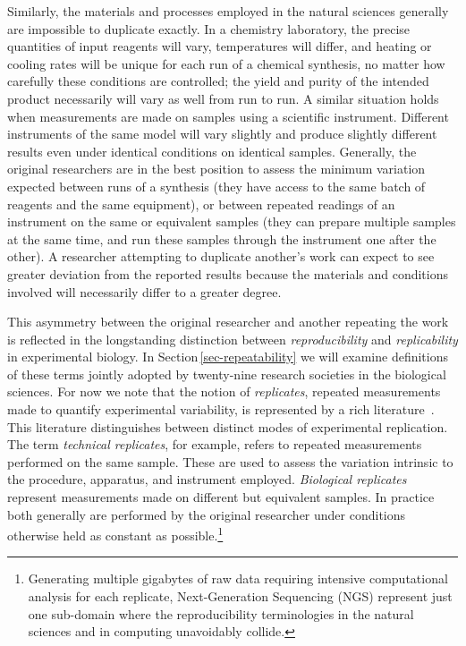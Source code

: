 Similarly, the materials and processes employed in the natural sciences generally are impossible
	to duplicate exactly.
In a chemistry laboratory, the precise quantities of input reagents will vary, temperatures will differ, and heating
	or cooling rates will be unique for each run of a chemical synthesis, no matter how carefully these conditions
	are controlled; the yield and purity of the intended product necessarily will vary as well from run to run.
A similar situation holds when measurements are made on samples using a scientific instrument.
Different instruments of the same model will vary slightly and produce slightly different results even
	under identical conditions on identical samples.
Generally, the original researchers are in the best position to assess the minimum variation expected
	between runs of a synthesis (they have access to the same batch of reagents and the same equipment),
	or between repeated readings of an instrument on the same or equivalent samples (they can prepare
	multiple samples at the same time, and run these samples through the instrument one after the other).
A researcher attempting to duplicate another's work can expect to see greater deviation from the reported results
	because the materials and conditions involved will necessarily differ to a greater degree.

This asymmetry between the original researcher and another repeating the work is reflected in the longstanding
	distinction between \emph{reproducibility} and \emph{replicability} in experimental biology.
In  Section\,\ref{sec-repeatability}  we will examine definitions of these terms jointly adopted by twenty-nine research
	societies in the biological sciences.
For now we note that the notion of \emph{replicates}, repeated measurements made to quantify
	experimental variability, is represented by a rich literature~\cite{robasky_role_2014}.
This literature distinguishes between distinct modes of experimental replication.
The term \emph{technical replicates}, for example, refers to repeated measurements performed on the same sample.
These are used to assess the variation intrinsic to the procedure, apparatus, and instrument employed.
\emph{Biological replicates} represent measurements made on different but equivalent samples.
In practice both generally are performed by the original researcher under conditions otherwise
	held as constant as possible.\footnote{Generating multiple gigabytes of raw data requiring intensive computational analysis for each replicate, Next-Generation Sequencing (NGS) represent just one sub-domain where the reproducibility
	terminologies in the natural sciences and in computing
        unavoidably collide.}



